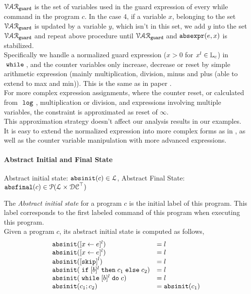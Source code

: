     $\mathcal{VAR}_{\mathtt{guard}}$ is the set of variables used in the guard expression of every while command in the program $c$. 
  In the case 4, if a variable $x$, belonging to the set 
  $\mathcal{VAR}_{\mathtt{guard}}$ is updated by a variable $y$, which isn't in this set, 
  we add $y$ into the set $\mathcal{VAR}_{\mathtt{guard}}$ and repeat 
  above procedure  until $\mathcal{VAR}_{\mathtt{guard}}$ and $\mathtt{abs}{\mathtt{expr}}(e, x)$ is stabilized. 
  \\
Specifically 
we handle a 
normalized guard expression ($ x > 0$ for $x^l \in \mathbb{L}_c$)
 in $\;\mathtt{while}\;$, and 
the counter variables only increase, decrease or reset by 
simple arithmetic expression (mainly multiplication, division, minus and plus (able to extend to max and min)). 
This is the same as in paper \cite{sinn2017complexity}. 
\\
For more complex expression assignments, where the counter reset, or calculated from $~\mathtt{log}~$, 
multiplication or division, and expressions involving multiple variables, the constraint is approximated as reset of $\infty$.
\\
This approximation strategy
doesn't affect our analysis results in our examples. It is easy to extend the normalized expression 
into more complex forms as in \cite{sinn2017complexity}, as well as the 
counter variable manipulation with more advanced expressions.


\paragraph{Abstract Initial and Final State}
%
Abstract initial state: $\mathtt{abs}{\mathtt{init}}(c) \in \mathcal{L}$,
Abstract Final State: $\mathtt{abs}{\mathtt{final}}(c) \in \mathcal{P}(\mathcal{L} \times \mathcal{DC}^{\top})$

The \emph{Abstract initial state} for a program $c$ is the initial label of this program.
This label corresponds to the first labeled command of this program 
when executing this program.
\\
Given a program $c$, its abstract initial state is computed as follows,
%
\[
  \begin{array}{ll}
    \absinit(\clabel{\assign{x}{\expr}}{}^l)  & = l  \\
    \absinit(\clabel{\assign{x}{\expr}}{}^l)  & = l \\
    \absinit(\clabel{\eskip}^{l})  & = l \\
    \absinit(\eif [b]^l \ethen c_1 \eelse c_2)  & = l \\
    \absinit(\ewhile [b]^l \edo c)  & = l \\
    \absinit(c_1 ; c_2)  & = \absinit(c_1) \\
 \end{array}
 \]
%

